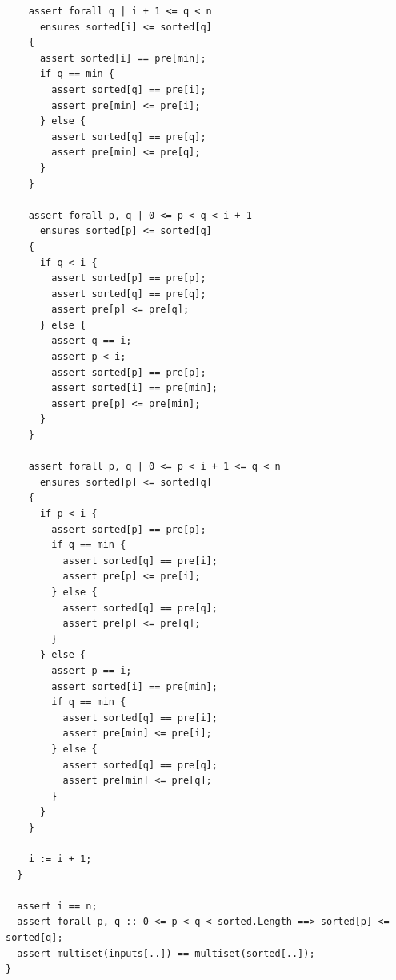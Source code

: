 \documentclass{article}
\begin{document}
\begin{lstlisting}
    assert forall q | i + 1 <= q < n
      ensures sorted[i] <= sorted[q]
    {
      assert sorted[i] == pre[min];
      if q == min {
        assert sorted[q] == pre[i];
        assert pre[min] <= pre[i];
      } else {
        assert sorted[q] == pre[q];
        assert pre[min] <= pre[q];
      }
    }

    assert forall p, q | 0 <= p < q < i + 1
      ensures sorted[p] <= sorted[q]
    {
      if q < i {
        assert sorted[p] == pre[p];
        assert sorted[q] == pre[q];
        assert pre[p] <= pre[q];
      } else {
        assert q == i;
        assert p < i;
        assert sorted[p] == pre[p];
        assert sorted[i] == pre[min];
        assert pre[p] <= pre[min];
      }
    }

    assert forall p, q | 0 <= p < i + 1 <= q < n
      ensures sorted[p] <= sorted[q]
    {
      if p < i {
        assert sorted[p] == pre[p];
        if q == min {
          assert sorted[q] == pre[i];
          assert pre[p] <= pre[i];
        } else {
          assert sorted[q] == pre[q];
          assert pre[p] <= pre[q];
        }
      } else {
        assert p == i;
        assert sorted[i] == pre[min];
        if q == min {
          assert sorted[q] == pre[i];
          assert pre[min] <= pre[i];
        } else {
          assert sorted[q] == pre[q];
          assert pre[min] <= pre[q];
        }
      }
    }

    i := i + 1;
  }

  assert i == n;
  assert forall p, q :: 0 <= p < q < sorted.Length ==> sorted[p] <= sorted[q];
  assert multiset(inputs[..]) == multiset(sorted[..]);
}
\end{lstlisting}
\end{document}
